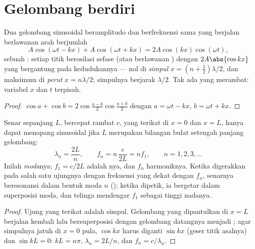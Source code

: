 \section{Gelombang berdiri}

\begin{theorem}\label{thm:b1:wave-propagation:standing}
Dua gelombang sinusoidal beramplitudo dan berfrekuensi sama yang
berjalan berlawanan arah berjumlah
\[
A\cos(\omega t - kx) + A\cos(\omega t + kx) = 2A\cos(kx)\cos(\omega t),
\]
sebuah \emph{}: setiap titik berosilasi sefase (atau
berlawanan ) dengan  $2A\abs{\cos kx}$ yang bergantung pada
kedudukannya --- nol di \emph{simpul} $x = (n + \tfrac12)\lambda/2$, dan
maksimum di \emph{perut} $x = n\lambda/2$; simpulnya berjarak
$\lambda/2$. Tak ada yang merambat: variabel $x$ dan $t$ terpisah.
\end{theorem}

\begin{proof}
$\cos a + \cos b = 2\cos\frac{a - b}{2}\cos\frac{a + b}{2}$ dengan
$a = \omega t - kx$, $b = \omega t + kx$.
\end{proof}

\begin{proposition}\label{prop:b1:wave-propagation:modes}
Senar sepanjang $L$, bercepat rambat $c$, yang terikat di $x = 0$ dan
$x = L$, hanya dapat menopang  sinusoidal jika $L$
merupakan bilangan bulat setengah panjang gelombang:
\[
\lambda_n = \frac{2L}{n}, \qquad f_n = n\,\frac{c}{2L} = n f_1,
\qquad n = 1, 2, 3, \dots
\]
Inilah \emph{moda}nya; $f_1 = c/2L$ adalah \emph{}nya,
dan $f_n$ harmoniknya. Ketika digerakkan pada salah satu ujungnya dengan
frekuensi yang dekat dengan $f_n$, senarnya beresonansi dalam bentuk
moda $n$ (); ketika dipetik, ia bergetar dalam
superposisi moda, dan telinga mendengar $f_1$ sebagai tinggi nadanya.
\end{proposition}

\begin{proof}
Ujung yang terikat adalah simpul. Gelombang yang dipantulkan di $x = L$
berjalan kembali lalu bersuperposisi dengan gelombang datangnya menjadi
; agar simpulnya jatuh di $x = 0$ pula, $\cos kx$ harus
diganti $\sin kx$ (geser titik asalnya) dan $\sin kL = 0$: $kL = n\pi$,
$\lambda_n = 2L/n$, dan $f_n = c/\lambda_n$.
\end{proof}

